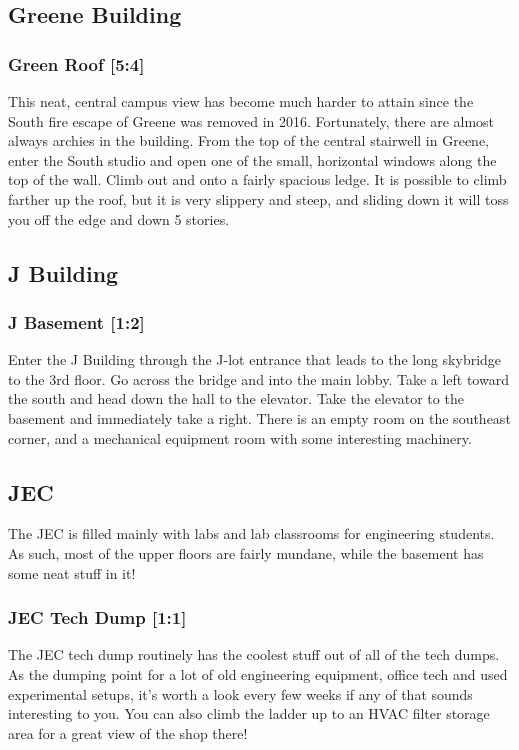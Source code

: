 \documentclass{article}
\begin{document}
\pagebreak
 \subsection{Greene Building}
\subsubsection{Green Roof [5:4]}
This neat, central campus view has become much harder to attain since the South fire escape of Greene was removed in 2016. Fortunately, there are almost always archies in the building. From the top of the central stairwell in Greene, enter the South studio and open one of the small, horizontal windows along the top of the wall. Climb out and onto a fairly spacious ledge. It is possible to climb farther up the roof, but it is very slippery and steep, and sliding down it will toss you off the edge and down 5 stories.
\pagebreak
\subsection{J Building}
\subsubsection{J Basement [1:2]}
Enter the J Building through the J-lot entrance that leads to the long skybridge to the 3rd floor. Go across the bridge and into the main lobby. Take a left toward the south and head down the hall to the elevator. Take the elevator to the basement and immediately take a right. There is an empty room on the southeast corner, and a mechanical equipment room with some interesting machinery.
\pagebreak
\subsection{JEC}
The JEC is filled mainly with labs and lab classrooms for engineering students. As such, most of the upper floors are fairly mundane, while the basement has some neat stuff in it!
\subsubsection{JEC Tech Dump [1:1]}
The JEC tech dump routinely has the coolest stuff out of all of the tech dumps. As the dumping point for a lot of old engineering equipment, office tech and used experimental setups, it’s worth a look every few weeks if any of that sounds interesting to you. You can also climb the ladder up to an HVAC filter storage area for a great view of the shop there!
\end{document}
